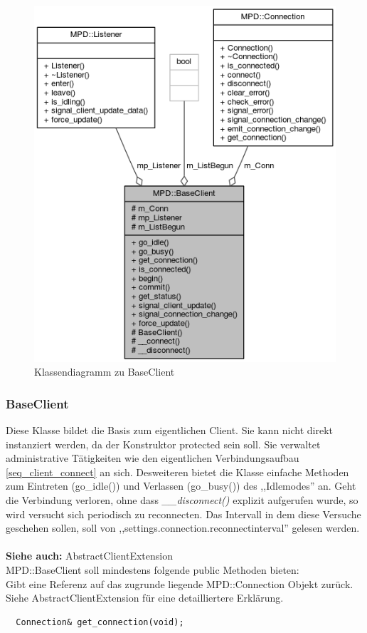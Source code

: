 \begin{figure}[htb!]
	\centering
        \includegraphics[scale=0.55]{BaseClientCollab.png}
	\caption{Klassendiagramm zu BaseClient}
	\label{collab_base_client}
\end{figure}

\subsubsection{BaseClient}
Diese Klasse bildet die Basis zum eigentlichen Client. Sie kann nicht direkt instanziert werden, da
der Konstruktor protected sein soll.
Sie verwaltet administrative Tätigkeiten wie den eigentlichen Verbindungsaufbau \ref{seq_client_connect} an sich. 
Desweiteren bietet die Klasse einfache Methoden zum Eintreten (go\_idle()) und Verlassen (go\_busy()) des ,,Idlemodes'' an.
Geht die Verbindung verloren, ohne dass \emph{\_\_disconnect()} explizit aufgerufen wurde, so wird versucht sich periodisch zu reconnecten.
Das Intervall in dem diese Versuche geschehen sollen, soll von ,,settings.connection.reconnectinterval'' gelesen werden.
\\
\\
\textbf{Siehe auch:} AbstractClientExtension
\\
MPD::BaseClient soll mindestens folgende public Methoden bieten:
\\
Gibt eine Referenz auf das zugrunde liegende MPD::Connection Objekt zurück. 
Siehe AbstractClientExtension für eine detailliertere Erklärung.
\\
\begin{verbatim}
  Connection& get_connection(void);
\end{verbatim}

